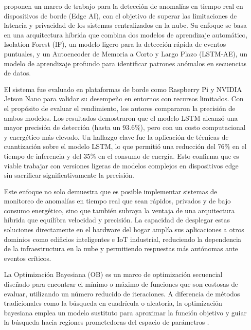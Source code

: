 \citeauthor{reis2025edge} \citeyear{reis2025edge} proponen un marco de trabajo para la detección de anomalías en tiempo real en dispositivos de borde (Edge AI), con el objetivo de superar las limitaciones de latencia y privacidad de los sistemas centralizados en la nube. Su enfoque se basa en una arquitectura híbrida que combina dos modelos de aprendizaje automático, Isolation Forest (IF), un modelo ligero para la detección rápida de eventos puntuales, y un Autoencoder de Memoria a Corto y Largo Plazo (LSTM-AE), un modelo de aprendizaje profundo para identificar patrones anómalos en secuencias de datos.

El sistema fue evaluado en plataformas de borde como Raspberry Pi y NVIDIA Jetson Nano para validar su desempeño en entornos con recursos limitados. Con el propósito de evaluar el rendimiento, los autores compararon la precisión de ambos modelos. Los resultados demostraron que el modelo LSTM alcanzó una mayor precisión de detección (hasta un 93.6\%), pero con un costo computacional y energético más elevado. Un hallazgo clave fue la aplicación de técnicas de cuantización sobre el modelo LSTM, lo que permitió una reducción del 76\% en el tiempo de inferencia y del 35\% en el consumo de energía. Esto confirma que es viable trabajar con versiones ligeras de modelos complejos en dispositivos edge sin sacrificar significativamente la precisión.

Este enfoque no solo demuestra que es posible implementar sistemas de monitoreo de anomalías en tiempo real que sean rápidos, privados y de bajo consumo energético, sino que también subraya la ventaja de una arquitectura híbrida que equilibra velocidad y precisión. La capacidad de desplegar estas soluciones directamente en el hardware del hogar amplía sus aplicaciones a otros dominios como edificios inteligentes e IoT industrial, reduciendo la dependencia de la infraestructura en la nube y permitiendo respuestas más autónomas ante eventos críticos.


La Optimización Bayesiana (OB) es un marco de optimización secuencial diseñado para encontrar el mínimo o máximo de funciones que son costosas de evaluar, utilizando un número reducido de iteraciones. A diferencia de métodos tradicionales como la búsqueda en cuadrícula o aleatoria, la optimización bayesiana emplea un modelo sustituto para aproximar la función objetivo y guiar la búsqueda hacia regiones prometedoras del espacio de parámetros \citeauthor{gardner2014bayesian} \citeyear{gardner2014bayesian}.

